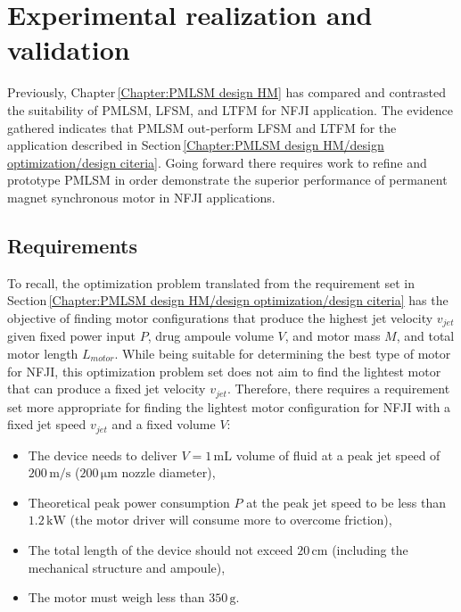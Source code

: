 \chapter{Experimental realization and validation}   \label{Chapter:experiment}
    
    
    Previously, Chapter\,\ref{Chapter:PMLSM design HM} has compared and contrasted the suitability of \acf{PMLSM}, \acf{LFSM}, and \acf{LTFM} for \acf{NFJI} application. The evidence gathered indicates that \acs{PMLSM} out-perform \acs{LFSM} and \acs{LTFM} for the application described in Section\,\ref{Chapter:PMLSM design HM/design optimization/design citeria}. Going forward there requires work to refine and prototype \acs{PMLSM} in order demonstrate the superior performance of permanent magnet synchronous motor in \acs{NFJI} applications.  
    
    
\section{Requirements}                              \label{Chapter:experiment/requirements}
    
    To recall, the optimization problem translated from the requirement set in Section\,\ref{Chapter:PMLSM design HM/design optimization/design citeria} has the objective of finding motor configurations that produce the highest jet velocity $v_{jet}$ given fixed power input $P$, drug ampoule volume $V$, and motor mass $M$, and total motor length $L_{motor}$. While being suitable for determining the best type of motor for \acs{NFJI}, this optimization problem set does not aim to find the lightest motor that can produce a fixed jet velocity $v_{jet}$. Therefore, there requires a requirement set more appropriate for finding the lightest motor configuration for  \acs{NFJI} with a fixed jet speed $v_{jet}$ and a fixed volume $V$:
    
    
    \begin{itemize}
        \item The device needs to deliver $V = 1\,\mathrm{mL}$ volume of fluid at a peak jet speed of $200\,\mathrm m/\mathrm s$ ($200\,\mathrm{\mu m}$ nozzle diameter),
        \item Theoretical peak power consumption $P$ at the peak jet speed to be less than $1.2\,\mathrm{kW}$ (the motor driver will consume more to overcome friction),
        \item The total length of the device should not exceed $20\,\mathrm{cm}$  (including the mechanical structure and ampoule),
        \item The motor must weigh less than $350\,\mathrm{g}$.
    \end{itemize}
    
